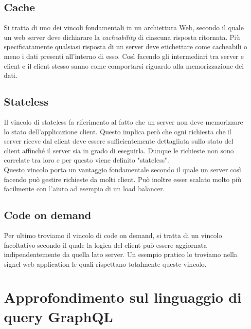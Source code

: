 \subsection*{Cache}
Si tratta di uno dei vincoli fondamentali in un archiettura Web, secondo il quale un web server deve dichiarare la \textit{cacheability} di ciascuna risposta ritornata. Più specificatamente qualsiasi risposta di un server deve etichettare come cacheabili o meno i dati presenti all'interno di esso. Così facendo gli intermediari tra server e client e il client stesso sanno come comportarsi riguardo alla memorizzazione dei dati.
\subsection*{Stateless}
Il vincolo di stateless fa riferimento al fatto che un server non deve memorizzare lo stato dell'applicazione client. Questo implica però che ogni richiesta che il server riceve dal client deve essere sufficientemente dettagliata sullo stato del client affinché il server sia in grado di eseguirla. Dunque le richieste non sono correlate tra loro e per questo viene definito "stateless". \\
Questo vincolo porta un vantaggio fondamentale secondo il quale un server così facendo può gestire richieste da molti client. Può inoltre esser scalato molto più facilmente con l'aiuto ad esempio di un load balancer.
\subsection*{Code on demand}
Per ultimo troviamo il vincolo di code on demand, si tratta di un vincolo facoltativo secondo il quale la logica del client può essere aggiornata indipendentemente da quella lato server. Un esempio pratico lo troviamo nella signel web application le quali rispettano totalmente queste vincolo.

\section{Approfondimento sul linguaggio di query GraphQL}
